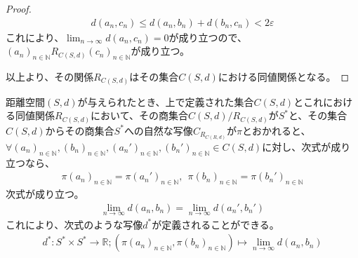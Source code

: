 \documentclass[dvipdfmx]{jsarticle}
\begin{document}
\begin{proof}
\begin{align*}
d\left( a_{n},c_{n} \right) \leq d\left( a_{n},b_{n} \right) + d\left( b_{n},c_{n} \right) < 2\varepsilon
\end{align*}
これにより、$\lim_{n \rightarrow \infty}{d\left( a_{n},c_{n} \right)} = 0$が成り立つので、$\left( a_{n} \right)_{n \in \mathbb{N}}R_{C(S,d)}\left( c_{n} \right)_{n \in \mathbb{N}}$が成り立つ。\par
以上より、その関係$R_{C(S,d)}$はその集合$C(S,d)$における同値関係となる。
\end{proof}
\begin{thm}\label{8.2.6.3}
距離空間$(S,d)$が与えられたとき、上で定義された集合$C(S,d)$とこれにおける同値関係$R_{C(S,d)}$において、その商集合${C(S,d)}/{R_{C(S,d)}}$が$S^{*}$と、その集合$C(S,d)$からその商集合$S^{*}$への自然な写像$C_{R_{C(R,d)}}$が$\pi$とおかれると、$\forall\left( a_{n} \right)_{n \in \mathbb{N}},\left( b_{n} \right)_{n \in \mathbb{N}},\left( a_{n}' \right)_{n \in \mathbb{N}},\left( b_{n}' \right)_{n \in \mathbb{N}} \in C(S,d)$に対し、次式が成り立つなら、
\begin{align*}
\pi\left( a_{n} \right)_{n \in \mathbb{N}} = \pi\left( a_{n}' \right)_{n \in \mathbb{N}},\ \ \pi\left( b_{n} \right)_{n \in \mathbb{N}} = \pi\left( b_{n}' \right)_{n \in \mathbb{N}}
\end{align*}
次式が成り立つ。
\begin{align*}
\lim_{n \rightarrow \infty}{d\left( a_{n},b_{n} \right)} = \lim_{n \rightarrow \infty}{d\left( a_{n}',b_{n}' \right)}
\end{align*}
これにより、次式のような写像$d^{*}$が定義されることができる。
\begin{align*}
d^{*}:S^{*} \times S^{*} \rightarrow \mathbb{R};\left( \pi\left( a_{n} \right)_{n \in \mathbb{N}},\pi\left( b_{n} \right)_{n \in \mathbb{N}} \right) \mapsto \lim_{n \rightarrow \infty}{d\left( a_{n},b_{n} \right)}
\end{align*}
\end{thm}
\end{document}
